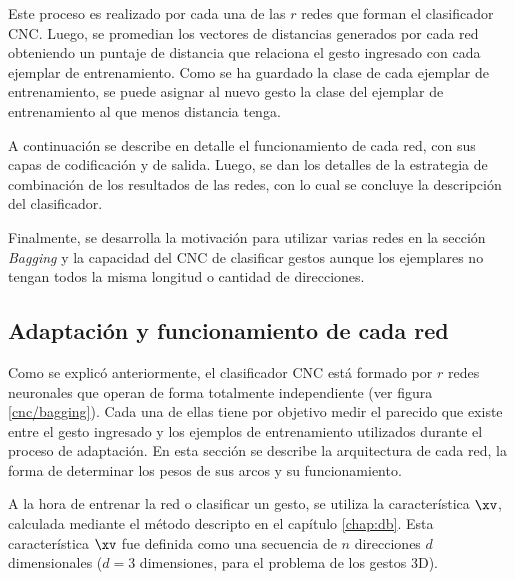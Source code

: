 
Este proceso es realizado por cada una de las $r$ redes que forman el clasificador CNC. Luego, se promedian los vectores de distancias generados por cada red obteniendo un puntaje de distancia que relaciona el gesto ingresado con cada ejemplar de entrenamiento. Como se ha guardado la clase de cada ejemplar de entrenamiento, se puede asignar al nuevo gesto la clase del ejemplar de entrenamiento al que menos distancia tenga.

A continuación se describe en detalle el funcionamiento de cada red, con sus capas de codificación y de salida. Luego, se dan los detalles de la estrategia de combinación de los resultados de las redes, con lo cual se concluye la descripción del clasificador.
 
Finalmente, se desarrolla la motivación para utilizar varias redes en la sección \textit{Bagging} y la capacidad del CNC de clasificar gestos aunque los ejemplares no tengan todos la misma longitud o cantidad de direcciones.

\subsection{Adaptación y funcionamiento de cada red}

Como se explicó anteriormente, el clasificador CNC está formado por $r$ redes neuronales que operan de forma totalmente independiente (ver figura \ref{cnc/bagging}). Cada una de ellas tiene por objetivo medir el parecido que existe entre el gesto ingresado y los ejemplos de entrenamiento utilizados durante el proceso de adaptación. En esta sección se describe la arquitectura de cada red, la forma de determinar los pesos de sus arcos y su funcionamiento.



A la hora de entrenar la red o clasificar un gesto, se utiliza la característica $\xv$, calculada mediante el método descripto en el capítulo \ref{chap:db}. Esta característica $\xv$ fue definida como una secuencia de $n$ direcciones $d$ dimensionales ($d=3$ dimensiones, para el problema de los gestos 3D).




